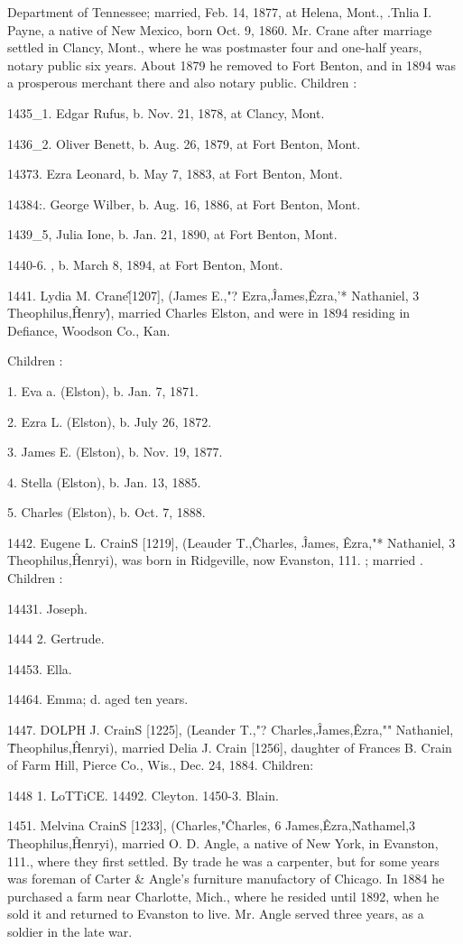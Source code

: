 \documentclass{book}
\begin{document}
Department of Tennessee; married, Feb. 14, 1877, at Helena, 
Mont., .Tnlia I. Payne, a native of New Mexico, born Oct. 9, 
1860. Mr. Crane after marriage settled in Clancy, Mont., where 
he was postmaster four and one-half years, notary public six 
years. About 1879 he removed to Fort Benton, and in 1894 was 
a prosperous merchant there and also notary public. Children : 

1435\_1. Edgar Rufus, b. Nov. 21, 1878, at Clancy, Mont. 

1436\_2. Oliver Benett, b. Aug. 26, 1879, at Fort Benton, Mont. 

14373. Ezra Leonard, b. May 7, 1883, at Fort Benton, Mont. 

14384:. George Wilber, b. Aug. 16, 1886, at Fort Benton, Mont. 

1439\_5, Julia Ione, b. Jan. 21, 1890, at Fort Benton, Mont. 

1440-6. , b. March 8, 1894, at Fort Benton, Mont. 

1441. Lydia M. Crane\^ [1207], (James E.,"? Ezra,\^ James,\^ 
Ezra,'* Nathaniel, 3 Theophilus,\^ Henry\^), married Charles Elston, 
and were in 1894 residing in Defiance, Woodson Co., Kan. 

Children : 

1. Eva a. (Elston), b. Jan. 7, 1871. 

2. Ezra L. (Elston), b. July 26, 1872. 

3. James E. (Elston), b. Nov. 19, 1877. 

4. Stella (Elston), b. Jan. 13, 1885. 

5. Charles (Elston), b. Oct. 7, 1888. 

1442. Eugene L. CrainS [1219], (Leauder T.,\^ Charles, \^ 
James, \^ Ezra,"* Nathaniel, 3 Theophilus,\^ Henryi), was born in 
Ridgeville, now Evanston, 111. ; married . Children : 

14431. Joseph. 

1444  2. Gertrude. 

14453. Ella. 

14464. Emma; d. aged ten years. 

1447. DOLPH J. CrainS [1225], (Leander T.,"? Charles,\^ 
James,\^ Ezra,"" Nathaniel, \^ Theophilus,\^ Henryi), married Delia 
J. Crain [1256], daughter of Frances B. Crain of Farm Hill, 
Pierce Co., Wis., Dec. 24, 1884. Children: 

1448  1. LoTTiCE. 
14492. Cleyton. 
1450-3. Blain. 

1451. Melvina CrainS [1233], (Charles,"\^ Charles, 6 James,\^ 
Ezra,\^ Nathamel,3 Theophilus,\^ Henryi), married O. D. Angle, 
a native of New York, in Evanston, 111., where they first settled. 
By trade he was a carpenter, but for some years was foreman 
of Carter \& Angle's furniture manufactory of Chicago. In 1884 
he purchased a farm near Charlotte, Mich., where he resided 
until 1892, when he sold it and returned to Evanston to live. 
Mr. Angle served three years, as a soldier in the late war. 
\end{document}
